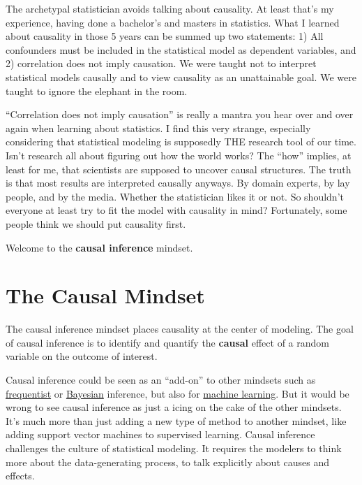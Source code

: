 \documentclass[
  10pt,
]{scrbook}
\begin{document}
The archetypal statistician avoids talking about causality.
At least that's my experience, having done a bachelor's and masters in statistics.
What I learned about causality in those 5 years can be summed up two statements: 1) All confounders must be included in the statistical model as dependent variables, and 2) correlation does not imply causation.
We were taught not to interpret statistical models causally and to view causality as an unattainable goal.
We were taught to ignore the elephant in the room.

``Correlation does not imply causation'' is really a mantra you hear over and over again when learning about statistics.
I find this very strange, especially considering that statistical modeling is supposedly THE research tool of our time.
Isn't research all about figuring out how the world works?
The ``how'' implies, at least for me, that scientists are supposed to uncover causal structures.
The truth is that most results are interpreted causally anyways.
By domain experts, by lay people, and by the media.
Whether the statistician likes it or not.
So shouldn't everyone at least try to fit the model with causality in mind?
Fortunately, some people think we should put causality first.

Welcome to the \textbf{causal inference} mindset.

\hypertarget{the-causal-mindset}{%
\section{The Causal Mindset}\label{the-causal-mindset}}

The causal inference mindset places causality at the center of modeling.
The goal of causal inference is to identify and quantify the \textbf{causal} effect of a random variable on the outcome of interest.

Causal inference could be seen as an ``add-on'' to other mindsets such as \protect\hyperlink{frequentism}{frequentist} or \protect\hyperlink{bayesian}{Bayesian} inference, but also for \protect\hyperlink{machine-learning}{machine learning}.
But it would be wrong to see causal inference as just a icing on the cake of the other mindsets.
It's much more than just adding a new type of method to another mindset, like adding support vector machines to supervised learning.
Causal inference challenges the culture of statistical modeling.
It requires the modelers to think more about the data-generating process, to talk explicitly about causes and effects.
\end{document}
